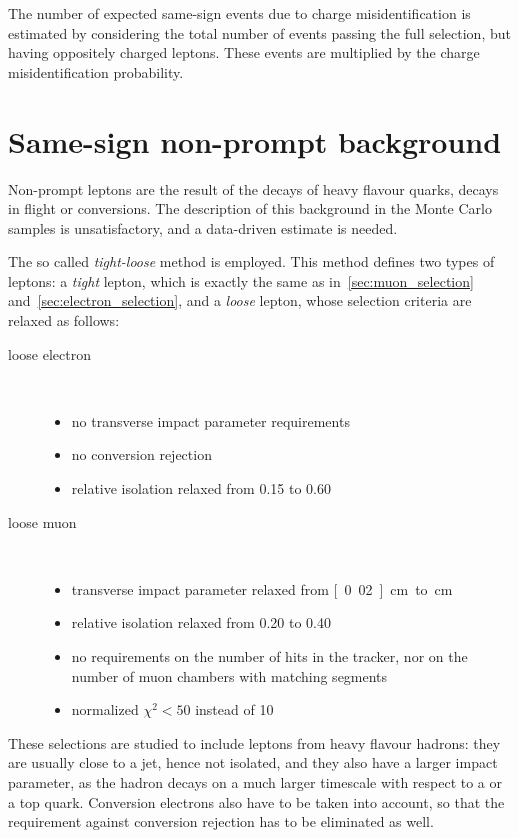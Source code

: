The number of expected same-sign events due to charge misidentification is estimated by considering the total number of events passing the 
full selection, but having oppositely charged leptons. These events are
multiplied by
the charge misidentification probability.

\section{Same-sign non-prompt background}
Non-prompt leptons are the result of the decays of heavy flavour quarks,
decays in flight or conversions. The description of this background in the
Monte Carlo samples is unsatisfactory, and a data-driven estimate is needed.

The so called \emph{tight-loose} method is employed. This method defines two
types of leptons: a \emph{tight} lepton, which is exactly the same as
in~\ref{sec:muon_selection} and~\ref{sec:electron_selection}, and a
\emph{loose} lepton, whose selection criteria are relaxed as follows:
\begin{description}
    \item[loose electron]\hspace*{\fill}\\
        \begin{itemize}
            \item no transverse impact parameter requirements
            \item no conversion rejection
            \item relative isolation relaxed from 0.15 to 0.60
        \end{itemize}
    \item[loose muon]\hspace*{\fill}\\ 
        \begin{itemize}
            \item transverse impact parameter relaxed from
                \unit[0.02]{cm} to \unit[2]{cm}
            \item relative isolation relaxed from 0.20 to 0.40
            \item no requirements on the number of hits in the tracker, nor
                on the number of muon chambers with matching segments
            \item normalized $\chi^2 < 50$ instead of 10
        \end{itemize}
\end{description}
These selections are studied to include \eg leptons from heavy flavour
hadrons: they are usually close to a jet, hence not isolated, and they also
have a larger impact parameter, as the hadron decays on a much larger
timescale with respect to a \TP or a top quark.
Conversion electrons also have to be taken into account, so that the
requirement against conversion rejection has to be eliminated as well.

